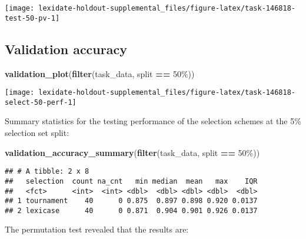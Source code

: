 \documentclass[
]{book}
\newenvironment{Shaded}{\begin{snugshade}}{\end{snugshade}}
\newcommand{\FunctionTok}[1]{\textcolor[rgb]{0.13,0.29,0.53}{\textbf{#1}}}
\newcommand{\NormalTok}[1]{#1}
\newcommand{\SpecialCharTok}[1]{\textcolor[rgb]{0.81,0.36,0.00}{\textbf{#1}}}
\newcommand{\StringTok}[1]{\textcolor[rgb]{0.31,0.60,0.02}{#1}}
\begin{document}
\texttt{[image: lexidate-holdout-supplemental\_files/figure-latex/task-146818-test-50-pv-1]}

\hypertarget{validation-accuracy-2}{%
\subsection{Validation accuracy}\label{validation-accuracy-2}}

\begin{Shaded}
\begin{Highlighting}[]
\FunctionTok{validation\_plot}\NormalTok{(}\FunctionTok{filter}\NormalTok{(task\_data, split }\SpecialCharTok{==} \StringTok{\textquotesingle{}50\%\textquotesingle{}}\NormalTok{))}
\end{Highlighting}
\end{Shaded}

\texttt{[image: lexidate-holdout-supplemental\_files/figure-latex/task-146818-select-50-perf-1]}

Summary statistics for the testing performance of the selection schemes at the 5\% selection set split:

\begin{Shaded}
\begin{Highlighting}[]
\FunctionTok{validation\_accuracy\_summary}\NormalTok{(}\FunctionTok{filter}\NormalTok{(task\_data, split }\SpecialCharTok{==} \StringTok{\textquotesingle{}50\%\textquotesingle{}}\NormalTok{))}
\end{Highlighting}
\end{Shaded}

\begin{verbatim}
## # A tibble: 2 x 8
##   selection  count na_cnt   min median  mean   max    IQR
##   <fct>      <int>  <int> <dbl>  <dbl> <dbl> <dbl>  <dbl>
## 1 tournament    40      0 0.875  0.897 0.898 0.920 0.0137
## 2 lexicase      40      0 0.871  0.904 0.901 0.926 0.0137
\end{verbatim}

The permutation test revealed that the results are:
\end{document}
